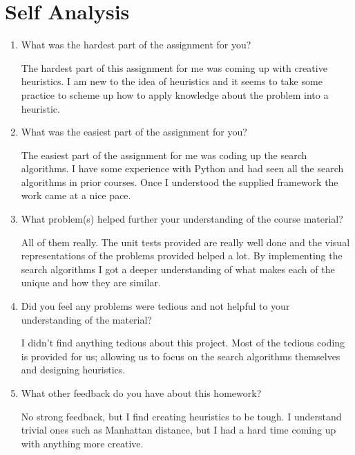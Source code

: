 \documentclass[fleqn]{hermans-hw}
\begin{document}
\section{Self Analysis}
\begin{enumerate}
	\item What was the hardest part of the assignment for you?
	
	The hardest part of this assignment for me was coming up with creative heuristics. I am new to the idea of heuristics and it seems to take some practice to scheme up how to apply knowledge about the problem into a heuristic.
	
	\item What was the easiest part of the assignment for you?
	
	The easiest part of the assignment for me was coding up the search algorithms. I have some experience with Python and had seen all the search algorithms in prior courses. Once I understood the supplied framework the work came at a nice pace.
	
	\item What problem(s) helped further your understanding of the course material?
	
	All of them really. The unit tests provided are really well done and the visual representations of the problems provided helped a lot. By implementing the search algorithms I got a deeper understanding of what makes each of the unique and how they are similar. 
	
	\item Did you feel any problems were tedious and not helpful to your understanding of the material?
	
	I didn't find anything tedious about this project. Most of the tedious coding is provided for us; allowing us to focus on the search algorithms themselves and designing heuristics.
	
	\item What other feedback do you have about this homework?
	
	No strong feedback, but I find creating heuristics to be tough. I understand trivial ones such as Manhattan distance, but I had a hard time coming up with anything more creative.
\end{enumerate}
\end{document}
